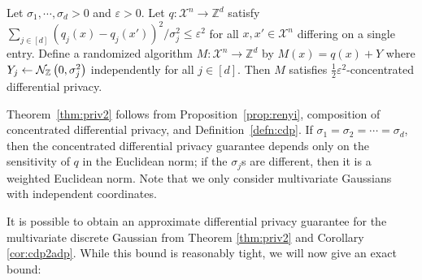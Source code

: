\documentclass{jpcfinal} %
\newcommand{\dgausss}[2]{{\discN\left(#1,#2\right)}}
\newcommand{\dgauss}[1]{\dgausss{0}{#1}}
\newcommand{\eps}{\varepsilon}
\newcommand{\Z}{\mathbb{Z}}
\begin{document}
\begin{thm}\label{thm:priv2}
Let $\sigma_1, \cdots, \sigma_d >0$ and $\eps > 0$.
Let $q\colon \mathcal{X}^n \to \Z^d$ satisfy $\sum_{j \in [d]} (q_j(x)-q_j(x'))^2/\sigma_j^2\le\eps^2$ for all $x,x'\in\mathcal{X}^n$ differing on a single entry. Define a randomized algorithm $M\colon \mathcal{X}^n \to \Z^d$ by $M(x)=q(x)+Y$ where $Y_j \gets \dgauss{\sigma_j^2}$ independently for all $j \in [d]$. Then $M$ satisfies $\frac12 \eps^2$-concentrated differential privacy.
\end{thm}
\noindent Theorem~\ref{thm:priv2} follows from Proposition~\ref{prop:renyi}, composition of concentrated differential privacy, and Definition~\ref{defn:cdp}. If $\sigma_1 = \sigma_2 = \cdots = \sigma_d$, then the concentrated differential privacy guarantee depends only on the sensitivity of $q$ in the Euclidean norm; if the $\sigma_j$s are different, then it is a weighted Euclidean norm. Note that we only consider multivariate Gaussians with independent coordinates.

It is possible to obtain an approximate differential privacy guarantee for the multivariate discrete Gaussian from Theorem \ref{thm:priv2} and Corollary \ref{cor:cdp2adp}. While this bound is reasonably tight, we will now give an exact bound:
\end{document}
